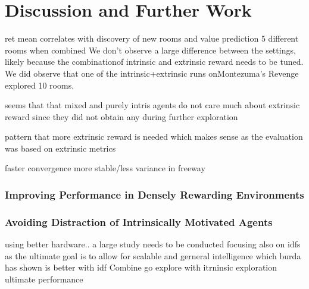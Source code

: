 \documentclass[draft,final]{vutinfth} %
\begin{document}
%
%
%
%
    \glsresetall


    \chapter{Discussion and Further Work}\label{ch:discussion-and-further-work}

    ret mean correlates with discovery of new rooms and value prediction
    5 different rooms when combined
    We don’t observe a large difference between the settings, likely because the combinationof intrinsic and extrinsic reward needs to be tuned. We did observe that one of the intrinsic+extrinsic runs onMontezuma’s Revenge explored 10 rooms.

    seems that that mixed and purely intris agents do not care much about extrinsic reward since they did not obtain any during further exploration


    pattern that more extrinsic reward is needed which makes sense as the evaluation was based on extrinsic metrics

    faster convergence more stable/less variance in freeway
    \subsection{Improving Performance in Densely Rewarding Environments}

    \subsection{Avoiding Distraction of Intrinsically Motivated Agents}


    using better hardware.. a large study needs to be conducted
    focusing also on idfs as the ultimate goal is to allow for scalable and gerneral intelligence which burda has shown is better with idf
    Combine go explore with itrninsic exploration ultimate performance
\end{document}
